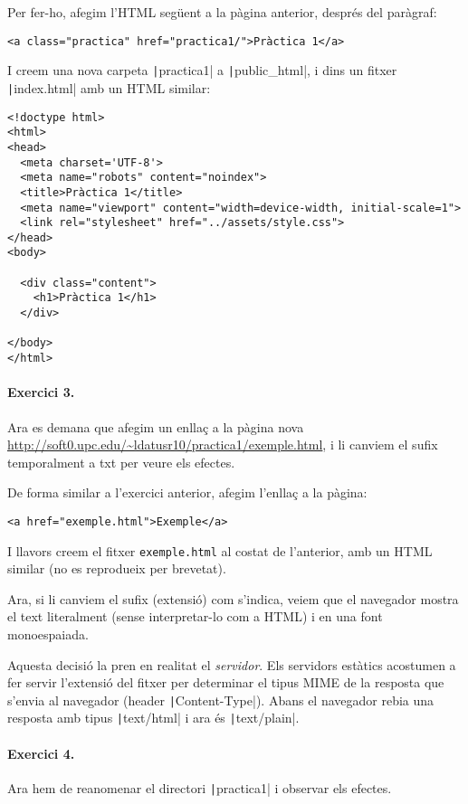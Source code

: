 \documentclass[catalan, a4paper]{scrartcl}
\begin{document}
Per fer-ho, afegim l'HTML següent a la pàgina anterior, després del
paràgraf:

\begin{verbatim}
<a class="practica" href="practica1/">Pràctica 1</a>
\end{verbatim}

I creem una nova carpeta \texttt|practica1| a \texttt|public_html|,
i dins un fitxer \texttt|index.html| amb un HTML similar:

\begin{verbatim}
<!doctype html>
<html>
<head>
  <meta charset='UTF-8'>
  <meta name="robots" content="noindex">
  <title>Pràctica 1</title>
  <meta name="viewport" content="width=device-width, initial-scale=1">
  <link rel="stylesheet" href="../assets/style.css">
</head>
<body>

  <div class="content">
    <h1>Pràctica 1</h1>
  </div>

</body>
</html>
\end{verbatim}


\paragraph{Exercici 3.} Ara es demana que afegim un enllaç a la pàgina
nova \url{http://soft0.upc.edu/~ldatusr10/practica1/exemple.html}, i li canviem
el sufix temporalment a \textsf{txt} per veure els efectes.

De forma similar a l'exercici anterior, afegim l'enllaç a la pàgina:

\begin{verbatim}
<a href="exemple.html">Exemple</a>
\end{verbatim}

I llavors creem el fitxer \texttt{exemple.html} al costat de l'anterior, amb un HTML
similar (no es reprodueix per brevetat).

Ara, si li canviem el sufix (extensió) com
s'indica, veiem que
el navegador mostra el text literalment (sense interpretar-lo com a HTML) i en
una font monoespaiada.

Aquesta decisió la pren en realitat el \emph{servidor}. Els servidors estàtics
acostumen a fer servir l'extensió del fitxer per determinar el tipus MIME de la
resposta que s'envia al navegador (header \texttt|Content-Type|).
Abans el navegador rebia una resposta amb tipus
\texttt|text/html| i ara és \texttt|text/plain|.


\paragraph{Exercici 4.} Ara hem de reanomenar el directori \texttt|practica1|
i observar els efectes.
\end{document}

